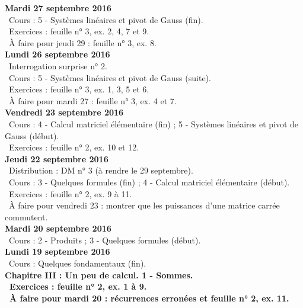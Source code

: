 \documentclass[12pt,a4paper]{article}
\begin{document}
\noindent\textbf{\bf Mardi 27 septembre 2016}\\
\bu\ Cours : 5 - Systèmes linéaires et pivot de Gauss (fin).\\
\bu\ Exercices : feuille n° 3, ex. 2, 4, 7 et 9.\\
\bu\ À faire pour jeudi 29 : feuille n° 3, ex. 8.\vspace{.4cm}\\

\noindent\textbf{Lundi 26 septembre 2016}\\
\bu\ Interrogation surprise n° 2.\\
\bu\ Cours : 5 - Systèmes linéaires et pivot de Gauss (suite).\\
\bu\ Exercices : feuille n° 3, ex. 1, 3, 5 et 6.\\
\bu\ À faire pour mardi 27 : feuille n° 3, ex. 4 et 7.\vspace{.4cm}\\

\noindent\textbf{Vendredi 23 septembre 2016}\\
\bu\ Cours : 4 - Calcul matriciel élémentaire (fin) ; 5 - Systèmes linéaires et pivot de Gauss (début).\\
\bu\ Exercices : feuille n° 2, ex. 10 et 12.\vspace{.4cm}\\

\noindent\textbf{Jeudi 22 septembre 2016}\\
\bu\ Distribution : DM n° 3 (à rendre le 29 septembre).\\
\bu\ Cours : 3 - Quelques formules (fin) ; 4 - Calcul matriciel
élémentaire (début).\\
\bu\ Exercices : feuille n° 2, ex. 9 à 11.\\
\bu\ À faire pour vendredi 23 : montrer que les puissances d'une matrice carrée commutent.\vspace{.4cm}\\

\noindent\textbf{\bf Mardi 20 septembre 2016}\\
\bu\ Cours : 2 - Produits ; 3 - Quelques formules (début).\vspace{.4cm}\\

\noindent\textbf{Lundi 19 septembre 2016}\\
\bu\ Cours : Quelques fondamentaux (fin).\\
\bf Chapitre III \rm : Un peu de calcul. 1 - Sommes.\\
\bu\ Exercices : feuille n° 2, ex. 1 à 9.\\
\bu\ À faire pour mardi 20 : récurrences erronées et feuille n° 2, ex. 11.\vspace{.4cm}\\
\end{document}
